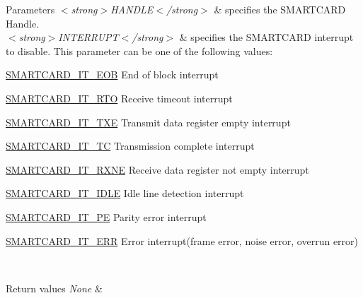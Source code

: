 \begin{DoxyParams}{Parameters}
{\em $<$strong$>$\+H\+A\+N\+D\+L\+E$<$/strong$>$} & specifies the S\+M\+A\+R\+T\+C\+A\+RD Handle. \\
\hline
{\em $<$strong$>$\+I\+N\+T\+E\+R\+R\+U\+P\+T$<$/strong$>$} & specifies the S\+M\+A\+R\+T\+C\+A\+RD interrupt to disable. This parameter can be one of the following values\+: \begin{DoxyItemize}
\item \hyperlink{group___s_m_a_r_t_c_a_r_d___interrupt__definition_ga0f1d46faf880c6d17c9156c049206a7c}{S\+M\+A\+R\+T\+C\+A\+R\+D\+\_\+\+I\+T\+\_\+\+E\+OB} End of block interrupt \item \hyperlink{group___s_m_a_r_t_c_a_r_d___interrupt__definition_ga9834b14912101cac858fd7b5de574f02}{S\+M\+A\+R\+T\+C\+A\+R\+D\+\_\+\+I\+T\+\_\+\+R\+TO} Receive timeout interrupt \item \hyperlink{group___s_m_a_r_t_c_a_r_d___interrupt__definition_ga758561a96d28254dc3504cb5325dad1f}{S\+M\+A\+R\+T\+C\+A\+R\+D\+\_\+\+I\+T\+\_\+\+T\+XE} Transmit data register empty interrupt \item \hyperlink{group___s_m_a_r_t_c_a_r_d___interrupt__definition_ga808ee7d7c209374af004e8bf1d2ca492}{S\+M\+A\+R\+T\+C\+A\+R\+D\+\_\+\+I\+T\+\_\+\+TC} Transmission complete interrupt \item \hyperlink{group___s_m_a_r_t_c_a_r_d___interrupt__definition_ga75b6c6e283a114afa1130f6f1bc98da6}{S\+M\+A\+R\+T\+C\+A\+R\+D\+\_\+\+I\+T\+\_\+\+R\+X\+NE} Receive data register not empty interrupt \item \hyperlink{group___s_m_a_r_t_c_a_r_d___interrupt__definition_ga0b1a5f7e611a976c71168a5b9e3a1f0e}{S\+M\+A\+R\+T\+C\+A\+R\+D\+\_\+\+I\+T\+\_\+\+I\+D\+LE} Idle line detection interrupt \item \hyperlink{group___s_m_a_r_t_c_a_r_d___interrupt__definition_gac56e07a71ab82a23930ad58e9a8dc806}{S\+M\+A\+R\+T\+C\+A\+R\+D\+\_\+\+I\+T\+\_\+\+PE} Parity error interrupt \item \hyperlink{group___s_m_a_r_t_c_a_r_d___interrupt__definition_ga751761f820948ee230b30a244ca85725}{S\+M\+A\+R\+T\+C\+A\+R\+D\+\_\+\+I\+T\+\_\+\+E\+RR} Error interrupt(frame error, noise error, overrun error) \end{DoxyItemize}
\\
\hline
\end{DoxyParams}

\begin{DoxyRetVals}{Return values}
{\em None} & \\
\hline
\end{DoxyRetVals}
\mbox{\label{group___s_m_a_r_t_c_a_r_d___exported___macros_gac739764f1f7326689516931771d60742}} 
